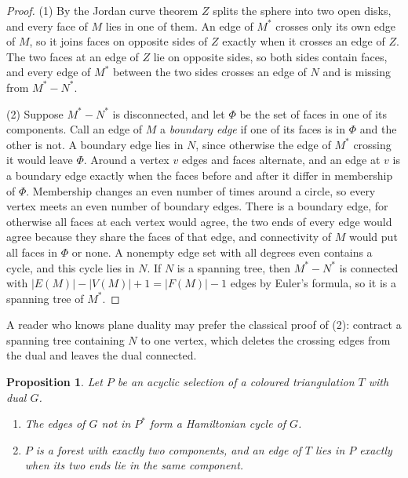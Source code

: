 \documentclass[10pt]{amsart}
\numberwithin{equation}{section}
\newtheorem{proposition}[equation]{Proposition}
\theoremstyle{definition}
\theoremstyle{remark}
\newcommand{\T}{T}
\begin{document}
\begin{proof}
(1) By the Jordan curve theorem $Z$ splits the sphere into two open disks, and every face of $M$ lies in one of them.
An edge of $M^*$ crosses only its own edge of $M$, so it joins faces on opposite sides of $Z$ exactly when it crosses an edge of $Z$.
The two faces at an edge of $Z$ lie on opposite sides, so both sides contain faces, and every edge of $M^*$ between the two sides crosses an edge of $N$ and is missing from $M^*-N^*$.

(2) Suppose $M^*-N^*$ is disconnected, and let $\Phi$ be the set of faces in one of its components.
Call an edge of $M$ a \emph{boundary edge} if one of its faces is in $\Phi$ and the other is not.
A boundary edge lies in $N$, since otherwise the edge of $M^*$ crossing it would leave $\Phi$.
Around a vertex $v$ edges and faces alternate, and an edge at $v$ is a boundary edge exactly when the faces before and after it differ in membership of $\Phi$.
Membership changes an even number of times around a circle, so every vertex meets an even number of boundary edges.
There is a boundary edge, for otherwise all faces at each vertex would agree, the two ends of every edge would agree because they share the faces of that edge, and connectivity of $M$ would put all faces in $\Phi$ or none.
A nonempty edge set with all degrees even contains a cycle, and this cycle lies in $N$.
If $N$ is a spanning tree, then $M^*-N^*$ is connected with $|E(M)|-|V(M)|+1=|F(M)|-1$ edges by Euler's formula, so it is a spanning tree of $M^*$.
\end{proof}

A reader who knows plane duality may prefer the classical proof of (2): contract a spanning tree containing $N$ to one vertex, which deletes the crossing edges from the dual and leaves the dual connected.

\begin{proposition}\label{prop:target}
Let $P$ be an acyclic selection of a coloured triangulation $\T$ with dual $G$.
\begin{enumerate}
\item The edges of $G$ not in $P^*$ form a Hamiltonian cycle of $G$.
\item $P$ is a forest with exactly two components, and an edge of $\T$ lies in $P$ exactly when its two ends lie in the same component.
\end{enumerate}
\end{proposition}
\end{document}
